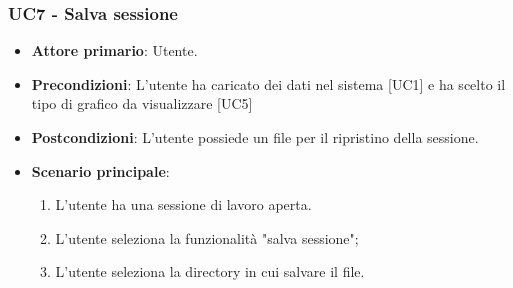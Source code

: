 \subsubsection{UC7 - Salva sessione}
\begin{itemize}
	\item \textbf{Attore primario}: Utente.
	\item \textbf{Precondizioni}: L'utente ha caricato dei dati nel sistema [UC1] e ha scelto il tipo di grafico da visualizzare [UC5]
	\item \textbf{Postcondizioni}: L'utente possiede un file  per il ripristino della sessione.
	\item \textbf{Scenario principale}:
		\begin{enumerate}
			\item L'utente ha una sessione di lavoro aperta.
			\item L'utente seleziona la funzionalità "salva sessione";
			\item L'utente seleziona la directory in cui salvare il file.
		\end{enumerate}
\end{itemize}
